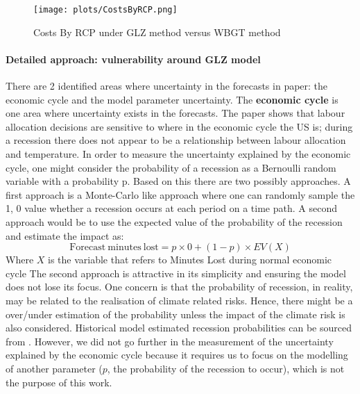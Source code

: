 \documentclass[a4paper,11pt]{extarticle} %
\theoremstyle{definition}
\begin{document}
\begin{figure}[h]
    \centering
    \texttt{[image: plots/CostsByRCP.png]}
    \caption{Costs By RCP under GLZ method versus WBGT method}
    \label{fig:CostsByRCP}
\end{figure}



\paragraph{Detailed approach: vulnerability around GLZ model}

There are 2 identified areas where uncertainty in the forecasts in \cite{TemperatureAndWork:2021} paper: the economic cycle and the model parameter uncertainty.
\newline
The \textbf{economic cycle} is one area where uncertainty exists in the forecasts.
The paper shows that labour allocation decisions are sensitive to where in the economic cycle the US is; during a recession there does not appear to be a relationship between labour allocation and temperature. In order to measure the uncertainty explained by the economic cycle, one might consider the probability of a recession as a Bernoulli random variable with a probability p. Based on this there are two possibly approaches. A first approach is a Monte-Carlo like approach where one can randomly sample the 1, 0 value whether a recession occurs at each period on a time path. A second approach would be to use the expected value of the probability of the recession and estimate the impact as:
\begin{equation}
    \label{Eq:economiccycle}
        \mathrm{Forecast \ minutes \ lost} = p \times 0 + (1-p) \times EV(X)
\end{equation}
Where $X$ is the variable that refers to Minutes Lost during normal economic cycle
The second approach is attractive in its simplicity and ensuring the model does not lose its focus.
One concern is that the probability of recession, in reality, may be related to the realisation of climate related risks. Hence, there might be a over/under estimation of the probability unless the impact of the climate risk is also considered. Historical model estimated recession probabilities can be sourced from \cite{SmoothedU.S.RecessionProbabilities:2022}. However, we did not go further in the measurement of the uncertainty explained by the economic cycle because it requires us to focus on the modelling of another parameter ($p$, the probability of the recession to occur), which is not the purpose of this work.
\end{document}
